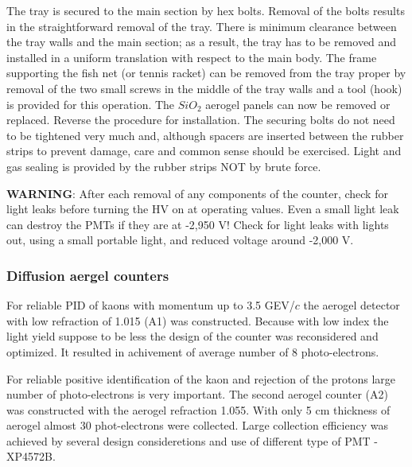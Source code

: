 The tray is secured to the main section by hex bolts. Removal of the bolts 
results in the straightforward removal of the tray. There is minimum clearance 
between the tray walls and the main section; as a result, the tray has to 
be removed and installed in a uniform translation with respect to the main 
body. The frame supporting the fish net (or tennis racket) can be removed from 
the tray proper by removal of the two small screws in the middle of the tray 
walls and a tool (hook) is provided for this operation. The $SiO_2$ aerogel 
panels can now be removed or replaced. Reverse the procedure for installation.
The securing bolts do not need to be tightened very much and, although spacers 
are inserted between the rubber strips to prevent damage, care and common sense 
 should be exercised. Light and gas sealing is provided by the 
rubber strips NOT by brute force.

{\bf WARNING}: After each removal of any components of the counter, check for light 
leaks before turning the HV on at operating values. Even a small light 
leak can destroy the PMTs if they are at -2,950 V! Check for light leaks with 
lights out, using a small portable light, and reduced voltage around -2,000 V.


\subsubsection {Diffusion aergel counters}

For reliable PID of kaons with momentum up to 3.5 GEV/$c$ 
the aerogel detector with low refraction of 1.015 (A1) was constructed.
Because with low index the light yield suppose to be less the design
of the counter was reconsidered and optimized. It resulted in
achivement of average number of 8 photo-electrons.

For reliable positive identification of the kaon and rejection of the protons 
large number of photo-electrons is very important. The second aerogel counter
(A2) was constructed with the aerogel refraction 1.055. With only 5 cm
thickness of aerogel almost 30 phot-electrons were collected. Large 
collection efficiency was achieved by several design consideretions and
use of different type of PMT - XP4572B.




